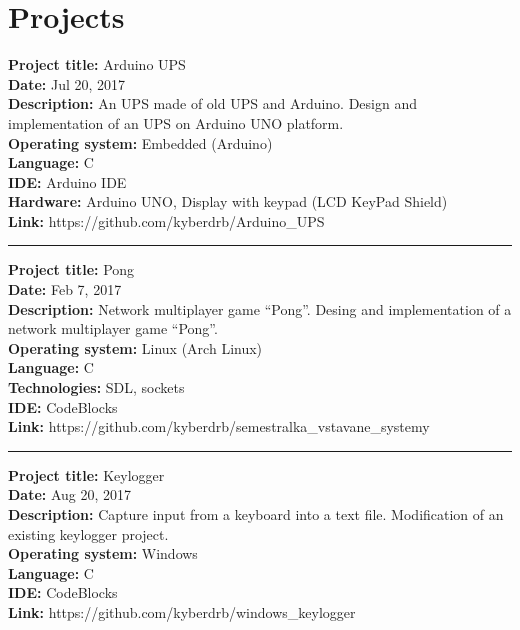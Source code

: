 \documentclass[slovak]{article}
\begin{document}
\section*{Projects}\label{projects}

\textbf{Project title:} Arduino UPS\\
\textbf{Date:} Jul 20, 2017\\
\textbf{Description:} An UPS made of old UPS and Arduino. Design and implementation of an UPS on Arduino UNO platform.\\
\textbf{Operating system:} Embedded (Arduino)\\
\textbf{Language:} C\\
\textbf{IDE:} Arduino IDE\\
\textbf{Hardware:} Arduino UNO, Display with keypad (LCD KeyPad Shield)\\
\textbf{Link:} https://github.com/kyberdrb/Arduino\_UPS

\begin{center}\rule{3in}{0.4pt}\end{center}

\noindent
\textbf{Project title:} Pong\\
\textbf{Date:} Feb 7, 2017\\
\textbf{Description:} Network multiplayer game ``Pong''. Desing and implementation of a network multiplayer game ``Pong''.\\
\textbf{Operating system:} Linux (Arch Linux)\\
\textbf{Language:} C\\
\textbf{Technologies:} SDL, sockets\\
\textbf{IDE:} CodeBlocks\\
\textbf{Link:} https://github.com/kyberdrb/semestralka\_vstavane\_systemy

\begin{center}\rule{3in}{0.4pt}\end{center}

\noindent
\textbf{Project title:} Keylogger\\
\textbf{Date:} Aug 20, 2017\\
\textbf{Description:} Capture input from a keyboard into a text file. Modification of an existing keylogger project.\\
\textbf{Operating system:} Windows\\
\textbf{Language:} C\\
\textbf{IDE:} CodeBlocks\\
\textbf{Link:} https://github.com/kyberdrb/windows\_keylogger
\end{document}
